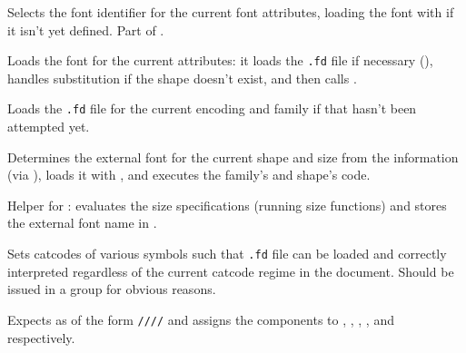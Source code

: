 \documentclass{l3in2edoc}
\begin{document}
\begin{function}[]
  {
    \pickup@font
  }
  Selects the font identifier for the current font attributes, loading
  the font with  if it isn't yet defined. Part of
  .
\end{function}


\begin{function}[]
  {
  }
  Loads the font for the current attributes: it loads the \texttt{.fd}
  file if necessary (), handles substitution if
  the shape doesn't exist, and then calls .
\end{function}


\begin{function}[]
  {
    \try@load@fontshape
  }
  Loads the \texttt{.fd} file for the current encoding and family if
  that hasn't been attempted yet.
\end{function}


\begin{function}[]
  {
    \extract@font
  }
  Determines the external font for the current shape and size from the
   information (via ),
  loads it with , and executes the family's and shape's
   code.
\end{function}



\begin{function}[]
  {
    \get@external@font
  }
  Helper for : evaluates the size specifications
  (running size functions) and stores the external font name in
  .
\end{function}



\begin{function}[]
  {
    \nfss@catcodes
  }
  Sets catcodes of various symbols such that \texttt{.fd} file can be
  loaded and correctly interpreted regardless of the current catcode
  regime in the document. Should be issued in a group for obvious
  reasons.
\end{function}








\begin{function}[int]
  {
    \split@name
  }
  \begin{syntax}
      
  \end{syntax}
  Expects as  of the form
  \texttt{////}
  and assigns the components to , ,
  , , and  respectively.
\end{function}
\end{document}
